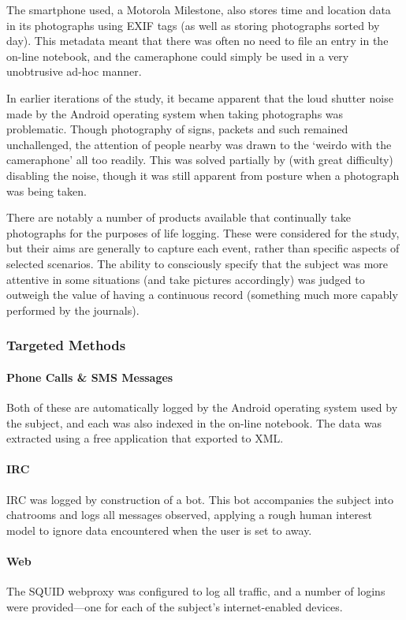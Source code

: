The smartphone used, a Motorola Milestone, also stores time and location data in its photographs using EXIF tags (as well as storing photographs sorted by day).  This metadata meant that there was often no need to file an entry in the on-line notebook, and the cameraphone could simply be used in a very unobtrusive ad-hoc manner.

In earlier iterations of the study, it became apparent that the loud shutter noise made by the Android operating system when taking photographs was problematic.  Though photography of signs, packets and such remained unchallenged, the attention of people nearby was drawn to the `weirdo with the cameraphone' all too readily.  This was solved partially by (with great difficulty) disabling the noise, though it was still apparent from posture when a photograph was being taken.

There are notably a number of products available that continually take photographs for the purposes of life logging.  These were considered for the study, but their aims are generally to capture each event, rather than specific aspects of selected scenarios.  The ability to consciously specify that the subject was more attentive in some situations (and take pictures accordingly) was judged to outweigh the value of having a continuous record (something much more capably performed by the journals).




\subsubsection{Targeted Methods}
\paragraph{Phone Calls \& SMS Messages}
Both of these are automatically logged by the Android operating system used by the subject, and each was also indexed in the on-line notebook.  The data was extracted using a free application that exported to XML.


\paragraph{IRC}
IRC was logged by construction of a bot.  This bot accompanies the subject into chatrooms and logs all messages observed, applying a rough human interest model to ignore data encountered when the user is set to away.


\paragraph{Web}
The SQUID webproxy was configured to log all traffic, and a number of logins were provided---one for each of the subject's internet-enabled devices.

